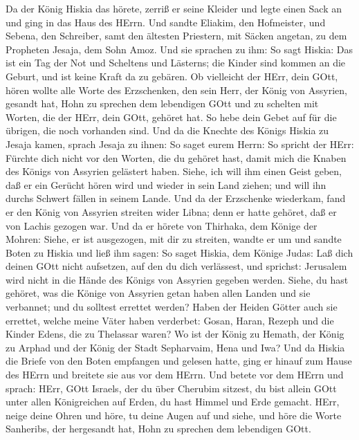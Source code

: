  Da der König Hiskia das hörete, zerriß er seine Kleider und
legte einen Sack an und ging in das Haus des HErrn.  Und
sandte Eliakim, den Hofmeister, und Sebena, den Schreiber, samt den
ältesten Priestern, mit Säcken angetan, zu dem Propheten Jesaja, dem
Sohn Amoz.  Und sie sprachen zu ihm: So sagt Hiskia: Das ist
ein Tag der Not und Scheltens und Lästerns; die Kinder sind kommen an
die Geburt, und ist keine Kraft da zu gebären.  Ob
vielleicht der HErr, dein GOtt, hören wollte alle Worte des Erzschenken,
den sein Herr, der König von Assyrien, gesandt hat, Hohn zu sprechen dem
lebendigen GOtt und zu schelten mit Worten, die der HErr, dein GOtt,
gehöret hat. So hebe dein Gebet auf für die übrigen, die noch vorhanden
sind.  Und da die Knechte des Königs Hiskia zu Jesaja kamen,
 sprach Jesaja zu ihnen: So saget eurem Herrn: So spricht
der HErr: Fürchte dich nicht vor den Worten, die du gehöret hast, damit
mich die Knaben des Königs von Assyrien gelästert haben. 
Siehe, ich will ihm einen Geist geben, daß er ein Gerücht hören wird und
wieder in sein Land ziehen; und will ihn durchs Schwert fällen in seinem
Lande.  Und da der Erzschenke wiederkam, fand er den König
von Assyrien streiten wider Libna; denn er hatte gehöret, daß er von
Lachis gezogen war.  Und da er hörete von Thirhaka, dem
Könige der Mohren: Siehe, er ist ausgezogen, mit dir zu streiten, wandte
er um und sandte Boten zu Hiskia und ließ ihm sagen:  So
saget Hiskia, dem Könige Judas: Laß dich deinen GOtt nicht aufsetzen,
auf den du dich verlässest, und sprichst: Jerusalem wird nicht in die
Hände des Königs von Assyrien gegeben werden.  Siehe, du
hast gehöret, was die Könige von Assyrien getan haben allen Landen und
sie verbannet; und du solltest errettet werden?  Haben der
Heiden Götter auch sie errettet, welche meine Väter haben verderbet:
Gosan, Haran, Rezeph und die Kinder Edens, die zu Thelassar waren?
 Wo ist der König zu Hemath, der König zu Arphad und der
König der Stadt Sepharvaim, Hena und Iwa?  Und da Hiskia
die Briefe von den Boten empfangen und gelesen hatte, ging er hinauf zum
Hause des HErrn und breitete sie aus vor dem HErrn.  Und
betete vor dem HErrn und sprach: HErr, GOtt Israels, der du über
Cherubim sitzest, du bist allein GOtt unter allen Königreichen auf
Erden, du hast Himmel und Erde gemacht.  HErr, neige deine
Ohren und höre, tu deine Augen auf und siehe, und höre die Worte
Sanheribs, der hergesandt hat, Hohn zu sprechen dem lebendigen GOtt.
